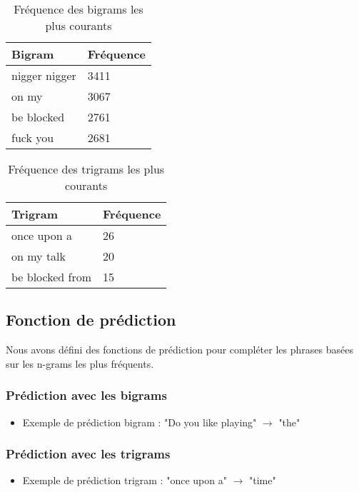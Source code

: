 \begin{table}[h]
    \centering
    \begin{tabular}{|l|l|}
    \hline
    \textbf{Bigram} & \textbf{Fréquence} \\ \hline
    nigger nigger & 3411 \\ \hline
    on my & 3067 \\ \hline
    be blocked & 2761 \\ \hline
    fuck you & 2681 \\ \hline
    \end{tabular}
    \caption{Fréquence des bigrams les plus courants}
\end{table}

\begin{table}[h]
    \centering
    \begin{tabular}{|l|l|}
    \hline
    \textbf{Trigram} & \textbf{Fréquence} \\ \hline
    once upon a & 26 \\ \hline
    on my talk & 20 \\ \hline
    be blocked from & 15 \\ \hline
    \end{tabular}
    \caption{Fréquence des trigrams les plus courants}
\end{table}

\subsection{Fonction de prédiction}

Nous avons défini des fonctions de prédiction pour compléter les phrases basées sur les n-grams les plus fréquents.

\subsubsection*{Prédiction avec les bigrams}

\begin{itemize}
    \item Exemple de prédiction bigram : "Do you like playing" $\rightarrow$ "the"
\end{itemize}

\subsubsection*{Prédiction avec les trigrams}

\begin{itemize}
    \item Exemple de prédiction trigram : "once upon a" $\rightarrow$ "time"
\end{itemize}

